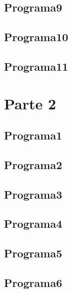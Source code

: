 \documentclass{article}
\begin{document}
\subsection{Programa9}

\newpage

\subsection{Programa10}

\newpage

\subsection{Programa11}

\newpage

\section{Parte 2}
\subsection{Programa1}

\newpage

\subsection{Programa2}

\newpage

\subsection{Programa3}

\newpage

\subsection{Programa4}

\newpage

\subsection{Programa5}

\newpage

\subsection{Programa6}

\newpage
\end{document}
